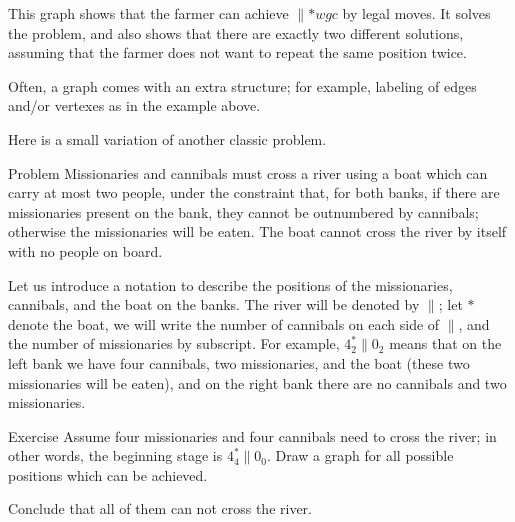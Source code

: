 \begin{center}
\end{center}

This graph shows that the farmer can achieve ${}{\parallel}{{*}wgc}$ by legal moves.
It solves the problem, and also shows that there are exactly two different solutions,
assuming that the farmer does not want to repeat the same position twice. 
\qeds

Often, a graph comes with an extra structure; for example, labeling of edges and/or vertexes as in the example above.

Here is a small variation of another classic problem.

\begin{thm}{Problem} Missionaries and cannibals must cross a river using a boat which can carry at most two people, under the constraint that, for both banks, if there are missionaries present on the bank, they cannot be outnumbered by cannibals; otherwise the missionaries will be eaten.
The boat cannot cross the river by itself with no people on board.
\end{thm}

Let us introduce a notation to describe the positions of the missionaries, cannibals, and the boat on the banks.
The river will be denoted by ${\parallel}$;
let $*$ denote the boat, we will write the number of cannibals on each side of ${\parallel}$, and the number of missionaries by subscript. 
For example, $4_2^*{\parallel}0_2$ means that on the left bank we have four cannibals, two missionaries, and the boat (these two missionaries will be eaten), and on the right bank there are no cannibals and two missionaries.

\begin{thm}{Exercise}
Assume four missionaries and four cannibals need to cross the river; in other words, the beginning stage is $4_4^*{\parallel}0_0$.
Draw a graph for all possible positions which can be achieved.

Conclude that all of them can not cross the river.
\end{thm}
